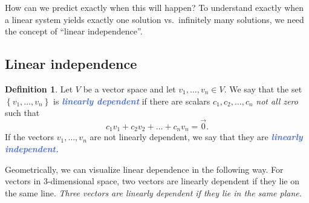 \documentclass[10pt]{article}
\newcommand{\demph}[1]{\textcolor{RoyalBlue}{\textbf{\slshape #1}}} %
\theoremstyle{definition}
\newtheorem{definition}[theorem]{Definition}
\begin{document}
How can we predict exactly when this will happen? To understand exactly when a
linear system yields exactly one solution vs.~infinitely many solutions, we
need the concept of ``linear independence''.

\subsection{Linear independence}
\begin{definition}
  Let $V$ be a vector space and let $v_{1},\ldots,v_{n}\in V$. We say that the
  set $\left\{v_{1},\ldots,v_{n}\right\}$ is \demph{linearly dependent} if
  there are scalars $c_{1},c_{2},\ldots,c_{n}$ \textit{not all zero} such that
  \begin{equation*}
    c_{1}v_{1}+c_{2}v_{2}+\ldots+c_{n}v_{n} = \vec{0}.
  \end{equation*}
  If the vectors $v_{1},\ldots,v_{n}$ are not linearly dependent, we say that
  they are \demph{linearly independent.}
\end{definition}

Geometrically, we can visualize linear dependence in the following way.  For
vectors in 3-dimensional space, two vectors are linearly dependent if they lie
on the same line. \textit{Three vectors are linearly dependent if they lie in the same
plane.}
\end{document}

